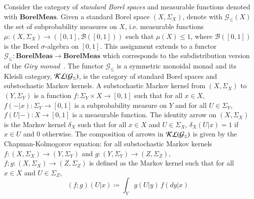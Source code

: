 Consider the category of \textit{standard Borel spaces} and measurable functions denoted with $\mathbf{BorelMeas}$.
Given a {standard Borel space} $(X,\Sigma_X)$, denote with $\mathcal{G}_{\le}(X)$ the set of subprobability measures on $X$, i.e. measurable functions $\mu:(X,\Sigma_X)\to ([0,1],\mathcal{B}([0,1]))$ such that $\mu(X)\le 1$, where $\mathcal{B}([0,1])$ is the Borel $\sigma$-algebra on $[0,1]$.  This assignment extends to a functor $\mathcal{G}_{\le}:\mathbf{BorelMeas}\to \mathbf{BorelMeas}$ which corresponds to the subdistribution version of the \textit{Giry monad}~\cite{giry2006categorical}. The functor $\mathcal{G}_{\le}$ is a symmetric monoidal monad and its Kleisli category, $\mathcal{KL}({\mathcal{G}_{\le}})$, is the category of standard Borel spaces and substochastic Markov kernels. A substochastic Markov kernel from $(X,\Sigma_X)$ to $(Y,\Sigma_Y)$ is a function $f\colon \Sigma_Y\times X\to [0,1]$ such that for all $x\in X$, $f(-|x)\colon \Sigma_Y\to [0,1]$ is a subprobability measure on $Y$ and for all $U\in \Sigma_Y$, $f(U|-)\colon X\to [0,1]$ is a measurable function.
The identity arrow on $(X,\Sigma_X)$ is the Markov kernel $\delta_X$ such that for all $x\in X$ and $U\in \Sigma_X$, $\delta_X(U|x)=1$ if $x\in U$ and $0$ otherwise. The composition of arrows in $\mathcal{KL}({\mathcal{G}_{\le}})$ is given by the Chapman-Kolmogorov equation: for all  substochastic Markov kernels $f\colon (X,\Sigma_X)\to (Y,\Sigma_Y)$ and $g\colon (Y,\Sigma_Y)\to (Z,\Sigma_Z)$, $f;g\colon (X,\Sigma_X)\to (Z,\Sigma_Z)$ is defined as the Markov kernel such that for all $x\in X$ and $U\in \Sigma_Z$,
\begin{equation*}
(f;g)(U|x)\coloneqq \int_Y g(U|y)\, f(dy|x)
\end{equation*}
   
